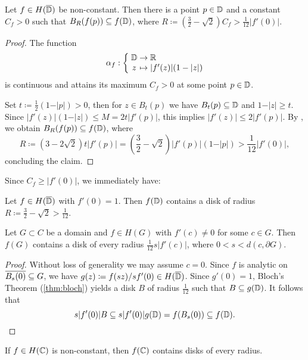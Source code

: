 \begin{theorem} \label{thm:bloch-stronger}
    Let $f \in H(\overline{\mathbb{D}})$ be non-constant. Then there is a point $p \in \mathbb{D}$ and a constant $C_f > 0$ such that $B_{R}(f(p)) \subseteq f(\mathbb{D})$, where $R \coloneqq (\frac{3}{2} - \sqrt{2}) C_f > \frac{1}{12} \vert f'(0) \vert$.
\end{theorem}

\begin{proof}
    The function
    $$ \mapping{\alpha_f}{\D & \to & \R}{z & \mapsto & \vert f'(z) \vert (1 - \vert z \vert)} $$
    is continuous and attains its maximum $C_f > 0$ at some point $p \in \mathbb{D}$.
    
    Set $t \coloneqq \frac{1}{2}(1 - \vert p \vert) > 0$, then for $z \in B_{t}(p)$ we have $B_{t}(p) \subseteq \mathbb{D}$ and $1 - \vert z \vert \geq t$. Since $\vert f'(z) \vert (1 - \vert z \vert) \leq M = 2 t \vert f'(p) \vert$, this implies $\vert f'(z) \vert \leq 2 \vert f'(p) \vert$. By , we obtain
    $ B_{R}(f(p)) \subseteq f(\mathbb{D}) $, where 
    $$ R \coloneqq (3 - 2 \sqrt{2}) t \vert f'(p) \vert = ({\textstyle \frac{3}{2}} - \sqrt{2}) \vert f'(p) \vert (1 - \vert p \vert) > {\textstyle \frac{1}{12}} \vert f'(0) \vert, $$
    concluding the claim.
\end{proof}

Since $C_f \geq \vert f'(0) \vert$, we immediately have:    

\begin{theorem}[Bloch] \label{thm:bloch}
    Let $f \in H(\overline{\mathbb{D}})$ with $f'(0) = 1$. Then $f(\mathbb{D})$ contains a disk of radius $R \coloneqq \frac{3}{2} - \sqrt{2} > \frac{1}{12}$.
\end{theorem}

\begin{corollary} \label{cor:bloch-domain}
    Let $G \subset C$ be a domain and $f \in H(G)$ with $f'(c) \neq 0$ for some $c \in G$. Then $f(G)$ contains a disk of every radius $\frac{1}{12} s \vert f'(c) \vert$, where $0 < s < d(c, \partial G)$.
\end{corollary}

\begin{proof}
    Without loss of generality we may assume $c = 0$. Since $f$ is analytic on $\overline{B_s(0)} \subseteq G$, we have $g(z) \coloneqq f(sz) / sf'(0) \in H(\overline{\mathbb{D}})$. Since $g'(0) = 1$, Bloch's Theorem (\ref{thm:bloch}) yields a disk $B$ of radius $\frac{1}{12}$ such that $B \subseteq g(\mathbb{D})$. It follows that
    \begin{equation*}
        s \vert f'(0) \vert B \subseteq s \vert f'(0) \vert g(\mathbb{D}) = f(B_s(0)) \subseteq f(\mathbb{D}).
    \end{equation*}
\end{proof}

\begin{corollary} \label{cor:bloch-entire}
    If $f \in H(\mathbb{C})$ is non-constant, then $f(\mathbb{C})$ contains disks of every radius.
\end{corollary}